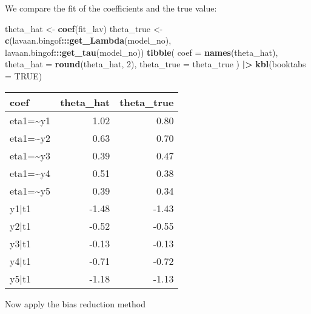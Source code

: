 \documentclass[
]{article}
\newenvironment{Shaded}{\begin{snugshade}}{\end{snugshade}}
\newcommand{\AttributeTok}[1]{\textcolor[rgb]{0.13,0.29,0.53}{#1}}
\newcommand{\ConstantTok}[1]{\textcolor[rgb]{0.56,0.35,0.01}{#1}}
\newcommand{\DecValTok}[1]{\textcolor[rgb]{0.00,0.00,0.81}{#1}}
\newcommand{\FunctionTok}[1]{\textcolor[rgb]{0.13,0.29,0.53}{\textbf{#1}}}
\newcommand{\NormalTok}[1]{#1}
\newcommand{\OtherTok}[1]{\textcolor[rgb]{0.56,0.35,0.01}{#1}}
\newcommand{\SpecialCharTok}[1]{\textcolor[rgb]{0.81,0.36,0.00}{\textbf{#1}}}
\begin{document}
We compare the fit of the coefficients and the true value:

\begin{Shaded}
\begin{Highlighting}[]
\NormalTok{theta\_hat }\OtherTok{\textless{}{-}} \FunctionTok{coef}\NormalTok{(fit\_lav)}
\NormalTok{theta\_true }\OtherTok{\textless{}{-}} \FunctionTok{c}\NormalTok{(lavaan.bingof}\SpecialCharTok{:::}\FunctionTok{get\_Lambda}\NormalTok{(model\_no),}
\NormalTok{                lavaan.bingof}\SpecialCharTok{:::}\FunctionTok{get\_tau}\NormalTok{(model\_no))}
\FunctionTok{tibble}\NormalTok{(}
  \AttributeTok{coef =} \FunctionTok{names}\NormalTok{(theta\_hat),}
  \AttributeTok{theta\_hat =} \FunctionTok{round}\NormalTok{(theta\_hat, }\DecValTok{2}\NormalTok{),}
  \AttributeTok{theta\_true =}\NormalTok{ theta\_true}
\NormalTok{) }\SpecialCharTok{|\textgreater{}}
  \FunctionTok{kbl}\NormalTok{(}\AttributeTok{booktabs =} \ConstantTok{TRUE}\NormalTok{)}
\end{Highlighting}
\end{Shaded}

\begin{tabular}[t]{lrr}
\toprule
coef & theta\_hat & theta\_true\\
\midrule
eta1=\textasciitilde{}y1 & 1.02 & 0.80\\
eta1=\textasciitilde{}y2 & 0.63 & 0.70\\
eta1=\textasciitilde{}y3 & 0.39 & 0.47\\
eta1=\textasciitilde{}y4 & 0.51 & 0.38\\
eta1=\textasciitilde{}y5 & 0.39 & 0.34\\
\addlinespace
y1|t1 & -1.48 & -1.43\\
y2|t1 & -0.52 & -0.55\\
y3|t1 & -0.13 & -0.13\\
y4|t1 & -0.71 & -0.72\\
y5|t1 & -1.18 & -1.13\\
\bottomrule
\end{tabular}

Now apply the bias reduction method
\end{document}
